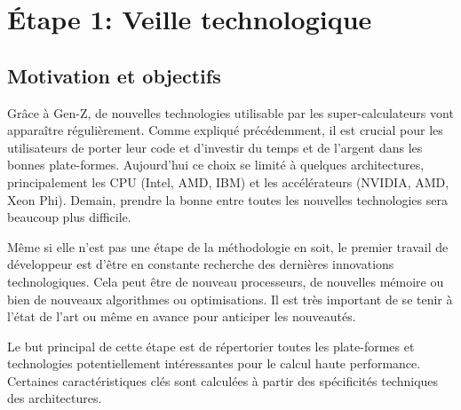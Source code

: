 \section{Étape 1: Veille technologique}

\subsection{Motivation et objectifs}

Grâce à Gen-Z, de nouvelles technologies utilisable par les super-calculateurs vont apparaître régulièrement. Comme expliqué précédemment, il est crucial pour les utilisateurs de porter leur code et d'investir du temps et de l'argent dans les bonnes plate-formes. Aujourd'hui ce choix se limité à quelques architectures, principalement les CPU (Intel, AMD, IBM) et les accélérateurs (NVIDIA, AMD, Xeon Phi). Demain, prendre la bonne entre toutes les nouvelles technologies sera beaucoup plus difficile.

Même si elle n'est pas une étape de la méthodologie en soit, le premier travail de développeur est d'être en constante recherche des dernières innovations technologiques. Cela peut être de nouveau processeurs, de nouvelles mémoire ou bien de nouveaux algorithmes ou optimisations. Il est très important de se tenir à l'état de l'art ou même en avance pour anticiper les nouveautés. 

Le but principal de cette étape est de répertorier toutes les plate-formes et technologies potentiellement intéressantes pour le calcul haute performance. Certaines caractéristiques clés sont calculées à partir des spécificités techniques des architectures.


